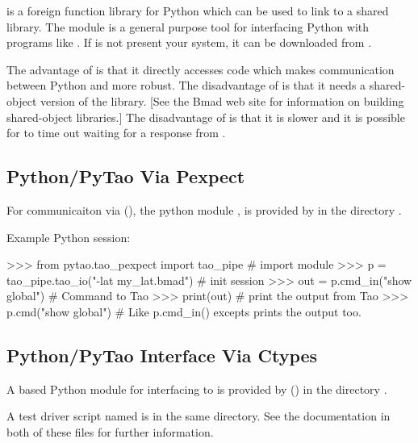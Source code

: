  is a foreign function library for Python which can be used to link to a \tao shared
library.  The  module is a general purpose tool for interfacing Python with programs
like \tao. If  is not present your system, it can be downloaded from
.

The advantage of  is that it directly accesses \tao code
which makes communication between Python and \tao more robust. The disadvantage of  is
that it needs a shared-object version of the  library. [See the Bmad web site for
information on building shared-object libraries.] The disadvantage of  is that it is
slower and it is possible for  to time out waiting for a response from \tao.

\subsection{Python/PyTao Via Pexpect}

For communicaiton via  (), the python module , is
provided by  in the directory .

Example Python session:
\begin{example}
  >>> from pytao.tao_pexpect import tao_pipe  # import module
  >>> p = tao_pipe.tao_io("-lat my_lat.bmad") # init session
  >>> out = p.cmd_in("show global")           # Command to Tao
  >>> print(out)                              # print the output from Tao
  >>> p.cmd("show global")                    # Like p.cmd_in() excepts prints the output too.
\end{example}

\subsection{Python/PyTao Interface Via Ctypes}

A  based Python module  for interfacing \tao to  is provided by
 () in the directory .

A test driver script named  is in the same directory. See the documentation in
both of these files for further information.

